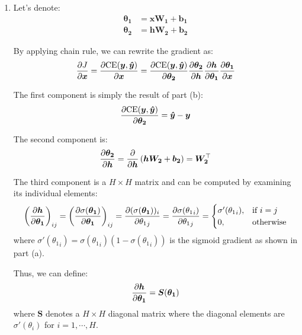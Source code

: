 \documentclass[10pt,reqno]{amsart}
\begin{document}
\begin{enumerate}[topsep=0pt,itemsep=3ex,partopsep=1ex,parsep=1ex]
\begin{enumerate}[itemsep=2ex]
  \item
    Let's denote:
    \begin{align*}
      \bm{\theta_1} &= \bm{x W_1} + \bm{b_1} \\
      \bm{\theta_2} &= \bm{h W_2} + \bm{b_2}
    \end{align*}
    
    By applying chain rule, we can rewrite the gradient as:
    \begin{equation*}
      \frac{\partial J}{\partial \bm{x}}
      = \frac{\partial \text{CE}(\bm{y}, \bm{\hat{y}})}{\partial \bm{x}}
      = \frac{\partial \text{CE}(\bm{y}, \bm{\hat{y}})}{\partial \bm{\theta_2}} \frac{\partial \bm{\theta_2}}{\partial \bm{h}} \frac{\partial \bm{h}}{\partial \bm{\theta_1}} \frac{\partial \bm{\theta_1}}{\partial \bm{x}}
    \end{equation*}
    
    The first component is simply the result of part (b):
    \begin{equation*}
      \frac{\partial \text{CE}(\bm{y}, \bm{\hat{y}})}{\partial \bm{\theta_2}} = \bm{\hat{y}} - \bm{y}
    \end{equation*}
    
    The second component is:
    \begin{equation*}
      \frac{\partial \bm{\theta_2}}{\partial \bm{h}} = \frac{\partial}{\partial \bm{h}} \left( \bm{h W_2} + \bm{b_2} \right) = \bm{W_2}^\top
    \end{equation*}

    The third component is a $H \times H$ matrix
    and can be computed by examining its individual elements:
    \begin{equation*}
      \left( \frac{\partial \bm{h}}{\partial \bm{\theta_1}} \right)_{ij}
      = \left( \frac{\partial \sigma(\bm{\theta_1})}{\partial \bm{\theta_1}} \right)_{ij} 
      = \frac{\partial (\sigma(\bm{\theta_1}))_i}{\partial {\theta_1}_j}
      = \frac{\partial \sigma({\theta_1}_i)}{\partial {\theta_1}_j} = 
      \begin{cases}
        \sigma'({\theta_1}_i), & \text{if}\ i=j \\
        0, & \text{otherwise}
      \end{cases}
    \end{equation*}
    where $\sigma'({\theta_1}_i) = \sigma({\theta_1}_i) \left( 1 - \sigma({\theta_1}_i) \right)$
    is the sigmoid gradient as shown in part (a).

    Thus, we can define: 
    \begin{equation*}
      \frac{\partial \bm{h}}{\partial \bm{\theta_1}} = \bm{S}(\bm{\theta_1})
    \end{equation*}
    where $\bm{S}$ denotes a $H \times H$ diagonal matrix where 
    the diagonal elements are $\sigma'(\theta_i)$ for $i = 1, \cdots, H$.


\end{enumerate}
\end{enumerate}
\end{document}
